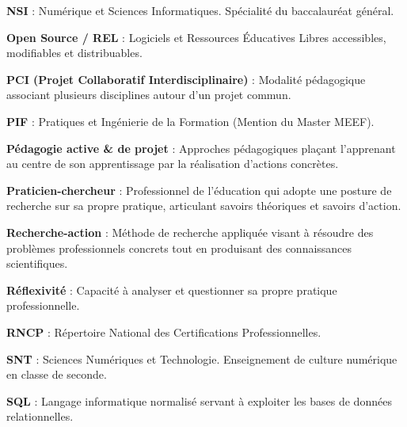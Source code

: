 \documentclass[12pt,a4paper]{report}
\begin{document}
\begin{tcolorbox}[colback=white,colframe=headercolor,title=\textbf{N},fonttitle=\large\bfseries]
\textbf{NSI} : Numérique et Sciences Informatiques. Spécialité du baccalauréat général.
\end{tcolorbox}

\begin{tcolorbox}[colback=white,colframe=headercolor,title=\textbf{O},fonttitle=\large\bfseries]
\textbf{Open Source / REL} : Logiciels et Ressources Éducatives Libres accessibles, modifiables et distribuables.
\end{tcolorbox}

\begin{tcolorbox}[colback=white,colframe=headercolor,title=\textbf{P},fonttitle=\large\bfseries]
\textbf{PCI (Projet Collaboratif Interdisciplinaire)} : Modalité pédagogique associant plusieurs disciplines autour d'un projet commun.

\textbf{PIF} : Pratiques et Ingénierie de la Formation (Mention du Master MEEF).

\textbf{Pédagogie active \& de projet} : Approches pédagogiques plaçant l'apprenant au centre de son apprentissage par la réalisation d'actions concrètes.

\textbf{Praticien-chercheur} : Professionnel de l'éducation qui adopte une posture de recherche sur sa propre pratique, articulant savoirs théoriques et savoirs d'action.
\end{tcolorbox}

\begin{tcolorbox}[colback=white,colframe=headercolor,title=\textbf{R},fonttitle=\large\bfseries]
\textbf{Recherche-action} : Méthode de recherche appliquée visant à résoudre des problèmes professionnels concrets tout en produisant des connaissances scientifiques.

\textbf{Réflexivité} : Capacité à analyser et questionner sa propre pratique professionnelle.

\textbf{RNCP} : Répertoire National des Certifications Professionnelles.
\end{tcolorbox}

\begin{tcolorbox}[colback=white,colframe=headercolor,title=\textbf{S},fonttitle=\large\bfseries]
\textbf{SNT} : Sciences Numériques et Technologie. Enseignement de culture numérique en classe de seconde.

\textbf{SQL} : Langage informatique normalisé servant à exploiter les bases de données relationnelles.
\end{tcolorbox}
\end{document}
